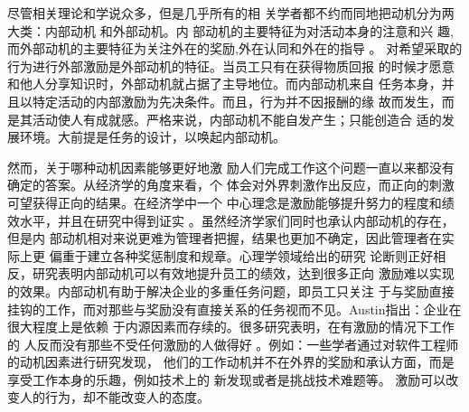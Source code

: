 \documentclass[12pt,a4paper,cs4size]{ctexart}
\begin{document}
尽管相关理论和学说众多，但是几乎所有的相
关学者都不约而同地把动机分为两大类：内部动机
和外部动机\cite{sansone2000iae}。内
部动机的主要特征为对活动本身的注意和兴
趣,而外部动机的主要特征为关注外在的奖励,外在认同和外在的指导
\cite{collins1999mac}。
对希望采取的行为进行外部激励是外部动机的特征。当员工只有在获得物质回报
的时候才愿意和他人分享知识时，外部动机就占据了主导地位。而内部动机来自
任务本身，并且以特定活动的内部激励为先决条件。而且，行为并不因报酬的缘
故而发生，而是其活动使人有成就感。严格来说，内部动机不能自发产生；只能创造合
适的发展环境。大前提是任务的设计，以唤起内部动机。
\cite{KaiMertins2003}



然而，关于哪种动机因素能够更好地激
励人们完成工作这个问题一直以来都没有确定的答案。从经济学的角度来看，个
体会对外界刺激作出反应，而正向的刺激可望获得正向的结果。在经济学中一个
中心理念是激励能够提升努力的程度和绩效水平，并且在研究中得到证实
\cite{388530120001201}。虽然经济学家们同时也承认内部动机的存在，但是内
部动机相对来说更难为管理者把握，结果也更加不确定，因此管理者在实际上更
偏重于建立各种奖惩制度和规章\cite{argyris1998ee}。心理学领域给出的研究
论断则正好相反，研究表明内部动机可以有效地提升员工的绩效，达到很多正向
激励难以实现的效果。内部动机有助于解决企业的多重任务问题\cite{gibbons1998io}\cite{holmstrom1991mpa}\cite{prendergast1999pif}，即员工只关注
于与奖励直接挂钩的工作，而对那些与奖励没有直接关系的任务视而不见。Austin指出：企业在很大程度上是依赖
于内源因素而存续的\cite{austin1996mam}。很多研究表明，在有激励的情况下工作的
人反而没有那些不受任何激励的人做得好
\cite{Deci1975}\cite{wilson1981aas}\cite{kruglanski1971eei}\cite{lepper1973ucs}
。例如：一些学者通过对软件工程师的动机因素进行研究发现，
他们的工作动机并不在外界的奖励和承认方面，而是享受工作本身的乐趣，例如技术上的
新发现或者是挑战技术难题等\cite{1252263}\cite{1125221}。
激励可以改变人的行为，却不能改变人的态度。
\end{document}
